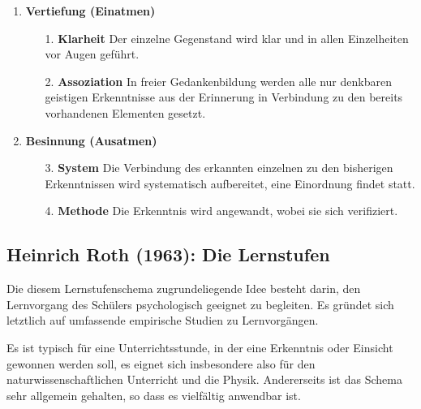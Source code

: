 \begin{enumerate}
	\item
	{\bf Vertiefung (Einatmen)}
	\begin{enumerate}
		\item[1.]
		{\bf Klarheit} Der einzelne Gegenstand wird klar und in allen
		Einzelheiten vor Augen gef\"{u}hrt.
		\item[2.]
		{\bf Assoziation} In freier Gedankenbildung werden alle nur
		denkbaren geistigen Erkenntnisse aus der Erinnerung in
		Verbindung zu den bereits vorhandenen Elementen gesetzt.
	\end{enumerate}

	\item {\bf Besinnung (Ausatmen)}
	\begin{enumerate}
		\item [3.]
		{\bf System} Die Verbindung des erkannten einzelnen zu den
		bisherigen Erkenntnissen wird systematisch aufbereitet, eine
		Einordnung findet statt.
		\item[4.]
		{\bf Methode} Die Erkenntnis wird angewandt, wobei sie sich
		verifiziert.
	\end{enumerate}
\end{enumerate}

\subsection{Heinrich Roth (1963): Die Lernstufen}
Die diesem Lernstufenschema zugrundeliegende Idee besteht
darin, den Lernvorgang des Sch\"{u}lers psychologisch geeignet zu
begleiten. Es gr\"{u}ndet sich letztlich auf umfassende empirische
Studien zu Lernvorg\"{a}ngen.

\mip
Es ist typisch f\"{u}r eine Unterrichtsstunde,
in der eine Erkenntnis oder Einsicht gewonnen werden soll, es
eignet sich insbesondere also f\"{u}r den naturwissenschaftlichen
Unterricht und die Physik.
Andererseits ist das Schema sehr allgemein gehalten, so dass es
vielf\"{a}ltig anwendbar ist.

